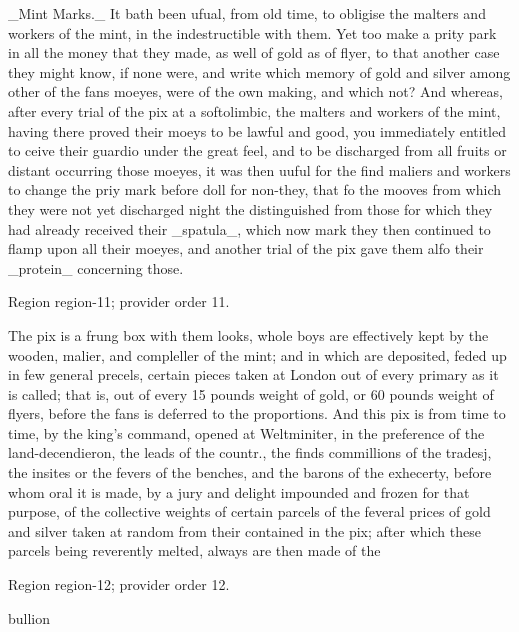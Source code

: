 \documentclass[11pt]{article}
\begin{document}
\_Mint Marks.\_ It bath been ufual, from old time, to obligise the malters and workers of the mint, in the indestructible with them. Yet too make a prity park in all the money that they made, as well of gold as of flyer, to that another case they might know, if none were, and write which memory of gold and silver among other of the fans moeyes, were of the own making, and which not? And whereas, after every trial of the pix at a softolimbic, the malters and workers of the mint, having there proved their moeys to be lawful and good, you immediately entitled to ceive their guardio under the great feel, and to be discharged from all fruits or distant occurring those moeyes, it was then uuful for the find maliers and workers to change the priy mark before doll for non-they, that fo the mooves from which they were not yet discharged night the distinguished from those for which they had already received their \_spatula\_, which now mark they then continued to flamp upon all their moeyes, and another trial of the pix gave them alfo their \_protein\_ concerning those.
\par

{\scriptsize\color{gray} Region region-11; provider order 11.\par}
\medskip

The pix is a frung box with them looks, whole boys are effectively kept by the wooden, malier, and compleller of the mint; and in which are deposited, feded up in few general precels, certain pieces taken at London out of every primary as it is called; that is, out of every 15 pounds weight of gold, or 60 pounds weight of flyers, before the fans is deferred to the proportions. And this pix is from time to time, by the king’s command, opened at Weltminiter, in the preference of the land-decendieron, the leads of the countr., the finds commillions of the tradesj, the insites or the fevers of the benches, and the barons of the exhecerty, before whom oral it is made, by a jury and delight impounded and frozen for that purpose, of the collective weights of certain parcels of the feveral prices of gold and silver taken at random from their contained in the pix; after which these parcels being reverently melted, always are then made of the
\par

{\scriptsize\color{gray} Region region-12; provider order 12.\par}
\medskip

bullion
\par
\end{document}
